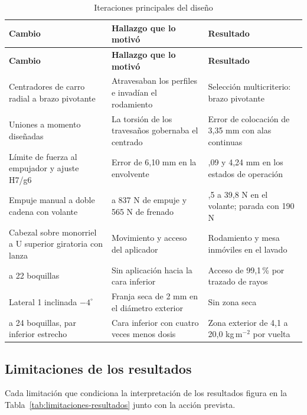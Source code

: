 \begingroup
\small\singlespacing
\setlength{\tabcolsep}{4pt}
\begin{longtable}{@{}>{\raggedright\arraybackslash}p{3.6cm}>{\raggedright\arraybackslash}p{\dimexpr(\textwidth-3.6cm-6\tabcolsep)/2\relax}>{\raggedright\arraybackslash}p{\dimexpr(\textwidth-3.6cm-6\tabcolsep)/2\relax}@{}}
\caption{Iteraciones principales del diseño}\label{tab:iteraciones-resumen}\\
\toprule
\textbf{Cambio} & \textbf{Hallazgo que lo motivó} & \textbf{Resultado}\\
\midrule\endfirsthead
\toprule
\textbf{Cambio} & \textbf{Hallazgo que lo motivó} & \textbf{Resultado}\\
\midrule\endhead
\bottomrule\endlastfoot
Centradores de carro radial a brazo pivotante & Atravesaban los perfiles e invadían el rodamiento & Selección multicriterio: brazo pivotante\\
Uniones a momento diseñadas & La torsión de los travesaños gobernaba el centrado & Error de colocación de 3,35 mm con alas continuas\\
Límite de fuerza al empujador y ajuste H7/g6 & Error de 6,10 mm en la envolvente & 4,09 y 4,24 mm en los estados de operación\\
Empuje manual a doble cadena con volante & 325 a 837 N de empuje y 565 N de frenado & 15,5 a 39,8 N en el volante; parada con 190 N\\
Cabezal sobre monorriel a U superior giratoria con lanza & Movimiento y acceso del aplicador & Rodamiento y mesa inmóviles en el lavado\\
19 a 22 boquillas & Sin aplicación hacia la cara inferior & Acceso de 99,1\,\% por trazado de rayos\\
Lateral 1 inclinada $-4^\circ$ & Franja seca de 2 mm en el diámetro exterior & Sin zona seca\\
22 a 24 boquillas, par inferior estrecho & Cara inferior con cuatro veces menos dosis & Zona exterior de 4,1 a 20,0 kg\,m$^{-2}$ por vuelta\\
\end{longtable}
\endgroup

\subsection{Limitaciones de los resultados}

Cada limitación que condiciona la interpretación de los resultados figura en la Tabla~\ref{tab:limitaciones-resultados} junto con la acción prevista.


